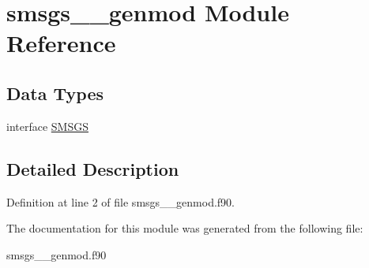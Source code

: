 \hypertarget{classsmsgs____genmod}{\section{smsgs\+\_\+\+\_\+genmod Module Reference}
\label{classsmsgs____genmod}
}
\subsection*{Data Types}
\begin{DoxyCompactItemize}
\item 
interface \hyperlink{interfacesmsgs____genmod_1_1_s_m_s_g_s}{S\+M\+S\+G\+S}
\end{DoxyCompactItemize}


\subsection{Detailed Description}


Definition at line 2 of file smsgs\+\_\+\+\_\+genmod.\+f90.



The documentation for this module was generated from the following file\+:\begin{DoxyCompactItemize}
\item 
smsgs\+\_\+\+\_\+genmod.\+f90\end{DoxyCompactItemize}
